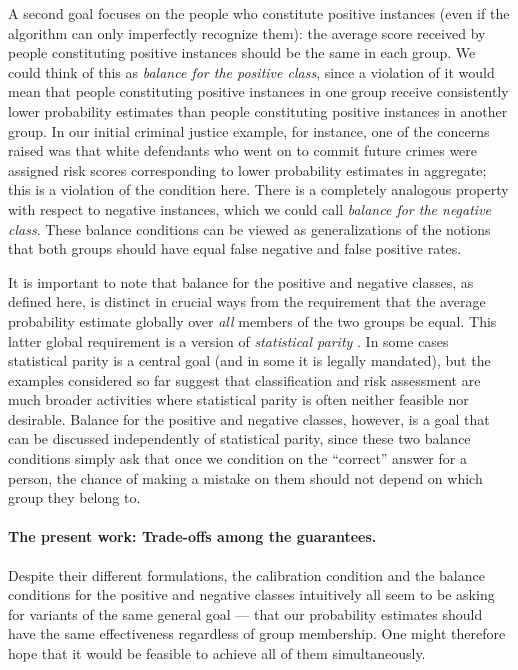 \documentclass[11pt]{article}
\newcommand{\xhdr}[1]{\vspace{-0.2in} \paragraph*{\bf {#1}.}}
\begin{document}
A second goal focuses on the people who constitute positive instances
(even if the algorithm can only imperfectly recognize them):
the average score received by people constituting positive instances
should be the same in each group.
We could think of this as {\em balance for the positive class},
since a violation of it would mean that people constituting positive
instances in one group receive consistently lower probability estimates
than people constituting positive instances in another group.
In our initial criminal justice example, for instance, one of the concerns
raised was that white defendants who went on to commit future crimes were
assigned risk scores corresponding to lower probability estimates
in aggregate; this is a violation of the condition here.
There is a completely analogous property with respect to negative instances,
which we could call {\em balance for the negative class}. These balance
conditions can be viewed as generalizations of the notions that both groups
should have equal false negative and false positive rates.

It is important to note that balance for the positive and negative classes,
as defined here, is distinct in crucial ways from the requirement 
that the average probability estimate globally 
over {\em all} members of the two groups be equal.  
This latter global requirement is a version of {\em statistical parity}
\cite{certifying-disparate-impact,three-naive-bayes-approaches,
classifying-without-discrimination,fairness-aware-regularization}.
In some cases statistical parity is a central goal (and in some it
is legally mandated), but the examples considered so far suggest that
classification and risk assessment
are much broader activities where statistical parity is often
neither feasible nor desirable.
Balance for the positive and negative classes, however, is a goal
that can be discussed independently of statistical parity,
since these two balance conditions
simply ask that once we condition on the ``correct'' answer for a person,
the chance of making a mistake on them should not depend on which group
they belong to.

\xhdr{The present work: Trade-offs among the guarantees}
Despite their different formulations, the calibration condition and 
the balance conditions for the positive and negative classes intuitively
all seem to be asking for variants of the same general goal --- that our
probability estimates should have the same effectiveness regardless of
group membership.  
One might therefore
hope that it would be feasible to achieve all of them
simultaneously.  
\end{document}
